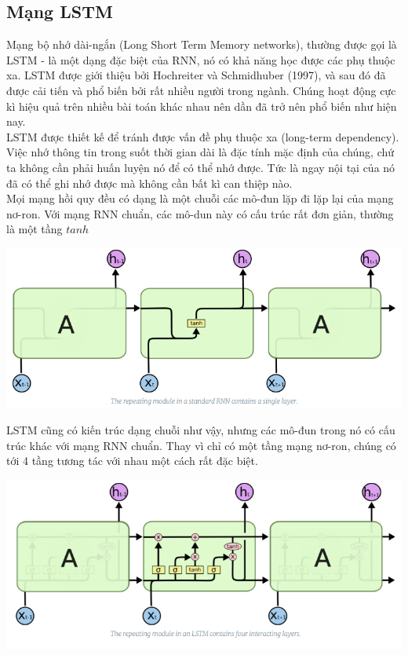 \subsection{Mạng LSTM}
Mạng bộ nhớ dài-ngắn (Long Short Term Memory networks), thường được gọi là LSTM - là một dạng đặc biệt của RNN, nó có khả năng học được các phụ thuộc xa. LSTM được giới thiệu bởi Hochreiter và Schmidhuber (1997), và sau đó đã được cải tiến và phổ biến bởi rất nhiều người trong ngành. Chúng hoạt động cực kì hiệu quả trên nhiều bài toán khác nhau nên dần đã trở nên phổ biến như hiện nay.\\
LSTM được thiết kế để tránh được vấn đề phụ thuộc xa (long-term dependency). Việc nhớ thông tin trong suốt thời gian dài là đặc tính mặc định của chúng, chứ ta không cần phải huấn luyện nó để có thể nhớ được. Tức là ngay nội tại của nó đã có thể ghi nhớ được mà không cần bất kì can thiệp nào.\\
Mọi mạng hồi quy đều có dạng là một chuỗi các mô-đun lặp đi lặp lại của mạng nơ-ron. Với mạng RNN chuẩn, các mô-dun này có cấu trúc rất đơn giản, thường là một tầng $tanh$
\begin{center}
    \includegraphics[scale=.3]{image/chapter6/lstm1.png}
    \begin{figure}[htp]
    \begin{center}
    \end{center}
    \end{figure}
\end{center}
LSTM cũng có kiến trúc dạng chuỗi như vậy, nhưng các mô-đun trong nó có cấu trúc khác với mạng RNN chuẩn. Thay vì chỉ có một tầng mạng nơ-ron, chúng có tới 4 tầng tương tác với nhau một cách rất đặc biệt.
\begin{center}
    \includegraphics[scale=.3]{image/chapter6/lstm2.png}
    \begin{figure}[htp]
    \begin{center}
     
    \end{center}
    \end{figure}
\end{center}
